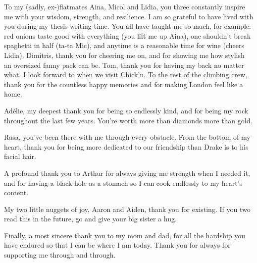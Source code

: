 \begin{acknowledgements}
    To my (sadly, ex-)flatmates Aina, Micol and Lidia, you three constantly inspire me with your wisdom, strength, and resilience. I am so grateful to have lived with you during my thesis writing time. You all have taught me so much, for example: red onions taste good with everything (you lift me up Aina), one shouldn’t break spaghetti in half (ta-ta Mic), and anytime is a reasonable time for wine (cheers Lidia). Dimitris, thank you for cheering me on, and for showing me how stylish an oversized fanny pack can be. Tom, thank you for having my back no matter what. I look forward to when we visit Chick’n. To the rest of the climbing crew, thank you for the countless happy memories and for making London feel like a home.
    
    Adélie, my deepest thank you for being so endlessly kind, and for being my rock throughout the last few years. You’re worth more than diamonds more than gold. 
    
    Rasa, you’ve been there with me through every obstacle. From the bottom of my heart, thank you for being more dedicated to our friendship than Drake is to his facial hair. 
    
    A profound thank you to Arthur for always giving me strength when I needed it, and for having a black hole as a stomach so I can cook endlessly to my heart’s content. 
    
    My two little nuggets of joy, Aaron and Aiden, thank you for existing. If you two read this in the future, go and give your big sister a hug.
    
    Finally, a most sincere thank you to my mom and dad, for all the hardship you have endured so that I can be where I am today. Thank you for always for supporting me through and through. 
\end{acknowledgements}

\tableofcontents

